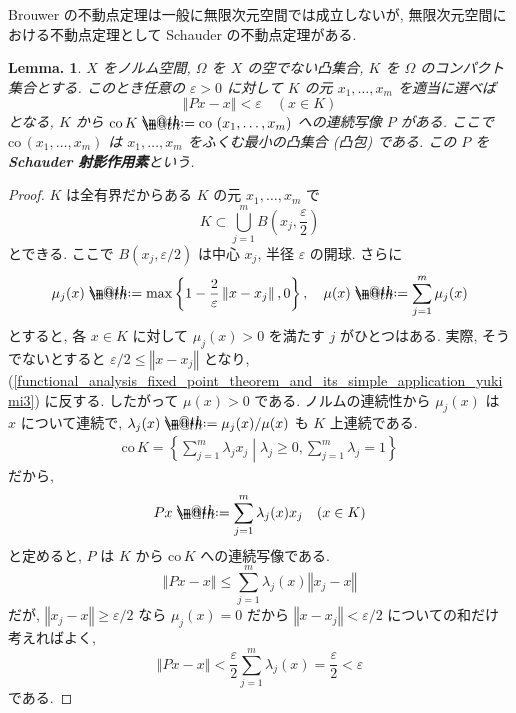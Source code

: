 \documentclass[openany, a4paper, oneside]{jsbook}
\makeatletter
\newcommand*{\defeq}{\mathrel{\rlap{%
\raisebox{0.3ex}{$\m@th\cdot$}}%
\raisebox{-0.3ex}{$\m@th\cdot$}}%
=}
\newcommand{\co}{\mathrm{co}\,}
\theoremstyle{break}
\theoremstyle{breakdefn}
\newtheorem{lem}[thm]{Lemma.}
\newcommand{\norm}[1]{\left\Vert#1\right\Vert}
\newcommand{\rbk}[1]{\left (#1\right)}
\newcommand{\cbk}[1]{\left\{#1\right\}}
\newcommand{\relmiddle}[1]{\mathrel{}\middle#1\mathrel{}}
\newcommand{\set}[2]{\left\{#1 \relmiddle| #2\right\}}
\makeatother
\begin{document}
Brouwer の不動点定理は一般に無限次元空間では成立しないが,
無限次元空間における不動点定理として Schauder の不動点定理がある.
\begin{lem}
 $X$ をノルム空間, $\Omega$ を $X$ の空でない凸集合,
 $K$ を $\Omega$ のコンパクト集合とする.
 このとき任意の $\varepsilon > 0$ に対して $K$ の元 $x_1, \dots , x_m$ を適当に選べば
 \begin{equation}
  \norm{Px - x}
  <
  \varepsilon \quad \rbk{x \in K}
 \end{equation}
 となる, $K$ から $\co K \defeq \co \rbk{x_1, \dots , x_m}$ への連続写像 $P$ がある.
 ここで $\co \rbk{x_1, \dots , x_m}$ は
 $x_1, \dots , x_m$ をふくむ最小の凸集合 (凸包) である.
 この $P$ を\textbf{Schauder 射影作用素}という.
\end{lem}
\begin{proof}
$K$ は全有界だからある $K$ の元 $x_1, \dots , x_m$ で
\begin{equation}\label{functional_analysis_fixed_point_theorem_and_its_simple_application_yukimi3}
 K
 \subset
 \bigcup_{j=1}^m B \rbk{x_j, \frac{\varepsilon}{2}}
\end{equation}
とできる.
ここで $B (x_j, \varepsilon / 2)$ は中心 $x_j$, 半径 $\varepsilon$ の開球.
さらに
\begin{equation}
 \mu_j(x)
 \defeq
 \max \cbk{1 - \frac{2}{\varepsilon} \norm{x - x_j}, 0}, \quad
 \mu (x)
 \defeq
 \sum_{j=1}^m \mu_j (x)
\end{equation}
とすると, 各 $x \in K$ に対して $\mu_j (x) > 0$ を満たす $j$ がひとつはある.
実際, そうでないとすると $\varepsilon / 2 \le \norm{x - x_j}$ となり,
(\ref{functional_analysis_fixed_point_theorem_and_its_simple_application_yukimi3}) に反する.
したがって $\mu (x) > 0$ である.
ノルムの連続性から $\mu_j (x)$ は $x$ について連続で,
$\lambda_j (x) \defeq \mu_j (x) / {\mu (x)}$ も $K$ 上連続である.
\begin{align}
 \co K
 =
 \set{\sum_{j=1}^m \lambda_j x_j}{\lambda_j \ge 0, \sum_{j=1}^m \lambda_j = 1}
\end{align}
だから,
\begin{equation}
 Px
 \defeq
 \sum_{j=1}^m \lambda_j (x) x_j \quad (x \in K)
\end{equation}
と定めると, $P$ は $K$ から $\co K$ への連続写像である.
\begin{equation}
 \norm{Px - x}
 \le
 \sum_{j=1}^m \lambda_j (x) \norm{x_j - x}
\end{equation}
だが,  $\norm{x_j - x} \ge \varepsilon / 2$ なら $\mu_j (x) = 0$ だから $\norm{x - x_j} < \varepsilon / 2$ についての和だけ考えればよく,
\begin{equation}
 \norm{Px - x}
 <
 \frac{\varepsilon}{2} \sum_{j=1}^m \lambda_j (x)
 =
 \frac{\varepsilon} {2}
 < \varepsilon
\end{equation}
である.
\end{proof}
\end{document}
